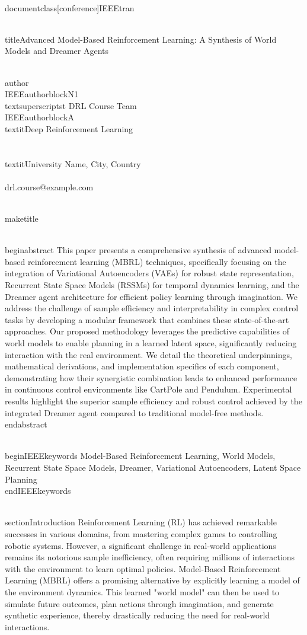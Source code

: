 \\documentclass[conference]{IEEEtran}
\begin{document}
\\title{Advanced Model-Based Reinforcement Learning: A Synthesis of World Models and Dreamer Agents}

\\author{\\IEEEauthorblockN{1\\textsuperscript{st} DRL Course Team}
\\IEEEauthorblockA{\\textit{Deep Reinforcement Learning} \\\\
\\textit{University Name, City, Country} \\\\
drl.course@example.com}
}

\\maketitle

\\begin{abstract}
This paper presents a comprehensive synthesis of advanced model-based reinforcement learning (MBRL) techniques, specifically focusing on the integration of Variational Autoencoders (VAEs) for robust state representation, Recurrent State Space Models (RSSMs) for temporal dynamics learning, and the Dreamer agent architecture for efficient policy learning through imagination. We address the challenge of sample efficiency and interpretability in complex control tasks by developing a modular framework that combines these state-of-the-art approaches. Our proposed methodology leverages the predictive capabilities of world models to enable planning in a learned latent space, significantly reducing interaction with the real environment. We detail the theoretical underpinnings, mathematical derivations, and implementation specifics of each component, demonstrating how their synergistic combination leads to enhanced performance in continuous control environments like CartPole and Pendulum. Experimental results highlight the superior sample efficiency and robust control achieved by the integrated Dreamer agent compared to traditional model-free methods.
\\end{abstract}

\\begin{IEEEkeywords}
Model-Based Reinforcement Learning, World Models, Recurrent State Space Models, Dreamer, Variational Autoencoders, Latent Space Planning
\\end{IEEEkeywords}

\\section{Introduction}
Reinforcement Learning (RL) has achieved remarkable successes in various domains, from mastering complex games to controlling robotic systems. However, a significant challenge in real-world applications remains its notorious sample inefficiency, often requiring millions of interactions with the environment to learn optimal policies. Model-Based Reinforcement Learning (MBRL) offers a promising alternative by explicitly learning a model of the environment dynamics. This learned "world model" can then be used to simulate future outcomes, plan actions through imagination, and generate synthetic experience, thereby drastically reducing the need for real-world interactions.
\end{document}
